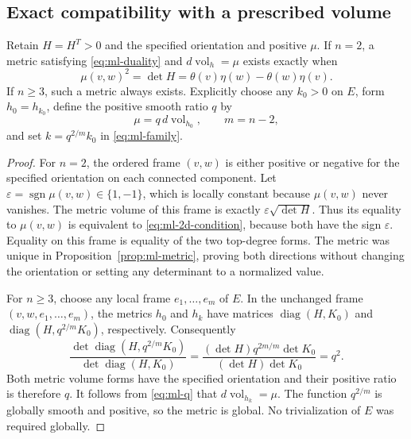 \subsection{Exact compatibility with a prescribed volume}
\begin{proposition}
\label{prop:ml-volume}
Retain $H=H^T>0$ and the specified orientation and positive $\mu$.
If $n=2$, a metric satisfying \eqref{eq:ml-duality} and
$d\operatorname{vol}_h=\mu$ exists exactly when
\begin{equation}\label{eq:ml-2d-condition}
 \mu(v,w)^2=\det H=\theta(v)\eta(w)-\theta(w)\eta(v).
\end{equation}
If $n\geq3$, such a metric always exists. Explicitly choose any $k_0>0$
on $E$, form $h_0=h_{k_0}$, define the positive smooth ratio $q$ by
\begin{equation}\label{eq:ml-q}
 \mu=q\,d\operatorname{vol}_{h_0},\qquad m=n-2,
\end{equation}
and set $k=q^{2/m}k_0$ in \eqref{eq:ml-family}.
\end{proposition}
\begin{proof}
For $n=2$, the ordered frame $(v,w)$ is either positive or negative for
the specified orientation on each connected component. Let
$\varepsilon=\operatorname{sgn}\mu(v,w)\in\{1,-1\}$, which is locally
constant because $\mu(v,w)$ never vanishes. The metric volume of this
frame is exactly $\varepsilon\sqrt{\det H}$. Thus its equality to
$\mu(v,w)$ is equivalent to \eqref{eq:ml-2d-condition}, because both
have the sign $\varepsilon$. Equality on this frame is equality of the
two top-degree forms. The metric was unique in
Proposition~\ref{prop:ml-metric}, proving both directions without changing
the orientation or setting any determinant to a normalized value.

For $n\geq3$, choose any local frame $e_1,\ldots,e_m$ of $E$. In the
unchanged frame $(v,w,e_1,\ldots,e_m)$, the metrics $h_0$ and $h_k$ have
matrices $\operatorname{diag}(H,K_0)$ and
$\operatorname{diag}(H,q^{2/m}K_0)$, respectively. Consequently
\[
 \frac{\det\operatorname{diag}(H,q^{2/m}K_0)}
      {\det\operatorname{diag}(H,K_0)}
 =\frac{(\det H)q^{2m/m}\det K_0}{(\det H)\det K_0}=q^2.
\]
Both metric volume forms have the specified orientation and their positive
ratio is therefore $q$. It follows from \eqref{eq:ml-q} that
$d\operatorname{vol}_{h_k}=\mu$. The function $q^{2/m}$ is globally smooth
and positive, so the metric is global. No trivialization of $E$ was
required globally.
\end{proof}

